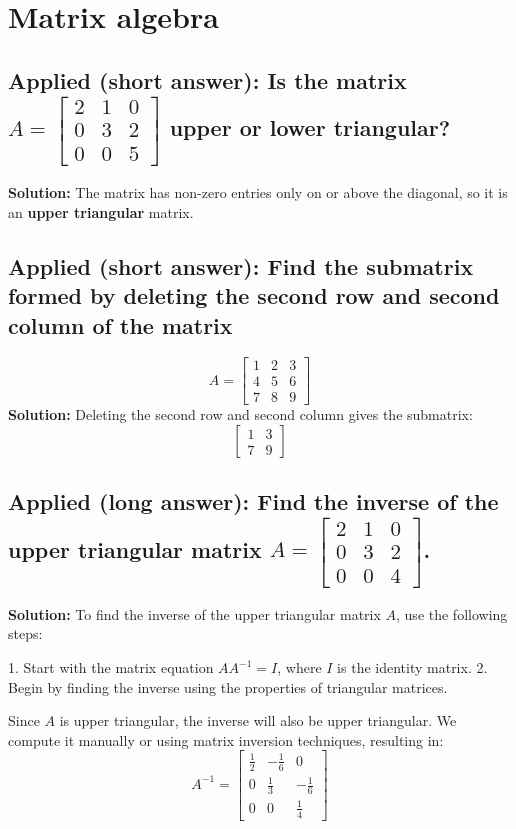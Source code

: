 \documentclass[12pt]{article}
\begin{document}
\section{Matrix algebra}


\subsection{Applied (short answer): Is the matrix \( A = \begin{bmatrix} 2 & 1 & 0 \\ 0 & 3 & 2 \\ 0 & 0 & 5 \end{bmatrix} \) upper or lower triangular?}
\textbf{Solution:} The matrix has non-zero entries only on or above the diagonal, so it is an \textbf{upper triangular} matrix.

\subsection{Applied (short answer): Find the submatrix formed by deleting the second row and second column of the matrix}
\[
A = \begin{bmatrix} 1 & 2 & 3 \\ 4 & 5 & 6 \\ 7 & 8 & 9 \end{bmatrix}
\]
\textbf{Solution:} Deleting the second row and second column gives the submatrix:
\[
\begin{bmatrix} 1 & 3 \\ 7 & 9 \end{bmatrix}
\]

\subsection{Applied (long answer): Find the inverse of the upper triangular matrix \( A = \begin{bmatrix} 2 & 1 & 0 \\ 0 & 3 & 2 \\ 0 & 0 & 4 \end{bmatrix} \).}
\textbf{Solution:}
To find the inverse of the upper triangular matrix \( A \), use the following steps:

1. Start with the matrix equation \( A A^{-1} = I \), where \( I \) is the identity matrix.
2. Begin by finding the inverse using the properties of triangular matrices.

Since \( A \) is upper triangular, the inverse will also be upper triangular. We compute it manually or using matrix inversion techniques, resulting in:
\[
A^{-1} = \begin{bmatrix} \frac{1}{2} & -\frac{1}{6} & 0 \\ 0 & \frac{1}{3} & -\frac{1}{6} \\ 0 & 0 & \frac{1}{4} \end{bmatrix}
\]
\end{document}
